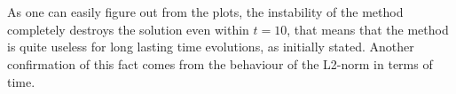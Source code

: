 \documentclass[11pt,a4paper]{article}
\begin{document}
\begin{figure}[!h]
\centering
{}
\end{figure}\ \\ \\
As one can easily figure out from the plots, the instability of the method completely destroys the solution even within $t=10$, that means that the method is quite useless for long lasting time evolutions, as initially stated. Another confirmation of this fact comes from the behaviour of the L2-norm in terms of time.
\end{document}
